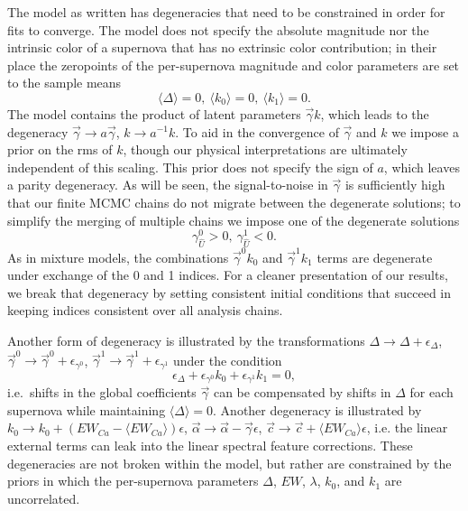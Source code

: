 \documentclass{aastex61}   	%
\begin{document}
The model as written has degeneracies that need to be constrained in order for fits to converge.
The model does not specify the absolute magnitude nor the intrinsic color of a supernova that has no extrinsic color contribution;
in their place the zeropoints of the per-supernova magnitude and color parameters are set to the sample means
\begin{equation}
\langle \Delta \rangle=0,\ \langle k_0 \rangle=0,\ \langle k_1 \rangle=0.
\end{equation}
The model contains the product of latent parameters
$\vec{\gamma} k$, which leads to the degeneracy $\vec{\gamma} \rightarrow a\vec{\gamma}$, $k \rightarrow a^{-1} k$.
To aid in the convergence of $\vec{\gamma}$ and $k$ we impose a prior on the rms of $k$, though
our physical interpretations are ultimately independent of this scaling.
This prior does not specify the sign of $a$, which leaves a parity degeneracy.  As will be seen, the signal-to-noise in $\vec{\gamma}$ is sufficiently
high that our finite MCMC chains do not migrate between the degenerate solutions; to simplify the merging of multiple chains
we impose one of the degenerate solutions
\begin{equation}
\gamma^0_{\hat{U}} > 0,\ \gamma^1_{\hat{U}} < 0.
\end{equation}
As  in mixture models, the combinations $\vec{\gamma}^0 k_0$ and $\vec{\gamma}^1 k_1$ terms are degenerate under exchange of the 0 and 1 indices. For a cleaner presentation of our results, 
we break that degeneracy  by setting consistent initial conditions that succeed in keeping indices consistent over all analysis chains.  


Another form of degeneracy is illustrated by the  transformations $\Delta \rightarrow \Delta  + \epsilon_\Delta$,
 $\vec{\gamma}^0 \rightarrow \vec{\gamma}^0  + \epsilon_{\gamma^0}$, $\vec{\gamma}^1 \rightarrow \vec{\gamma}^1 + \epsilon_{\gamma^1}$
 under the condition
$$
\epsilon_\Delta  +  \epsilon_{\gamma^0} k_0+  \epsilon_{\gamma^1} k_1=0,
$$
i.e.\ shifts in the global coefficients $\vec{\gamma}$ can be compensated by shifts in 
\color{red}
$\Delta$
\color{black}
for each supernova while maintaining 
$\langle \Delta \rangle=0$.
Another degeneracy is illustrated by $k_0 \rightarrow k_0 + (EW_{Ca}-\langle EW_{Ca}\rangle)\epsilon$,
$\vec{\alpha} \rightarrow \vec{\alpha} - \vec{\gamma} \epsilon$, $\vec{c} \rightarrow \vec{c} + \langle EW_{Ca}\rangle \epsilon$, i.e. the
linear external terms can leak into the linear spectral feature corrections.
These degeneracies are not broken within the model, but rather are constrained by the priors in which the
per-supernova parameters
$\Delta$, $EW$, $\lambda$, $k_0$, and $k_1$ are uncorrelated. 
\end{document}
